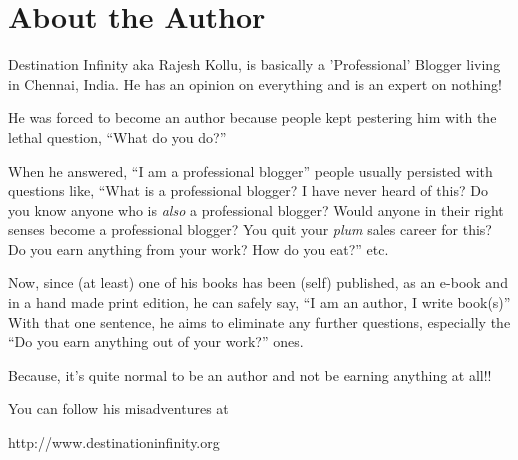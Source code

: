 \chapter{About the Author}

Destination Infinity aka Rajesh Kollu, is basically a 'Professional' Blogger
living in Chennai, India. He has an opinion on everything and is an expert on
nothing!

He was forced to become an author because people kept pestering him with the
lethal question, “What do you do?”

When he answered, “I am a professional blogger” people usually persisted with
questions like, “What is a professional blogger? I have never heard of this? Do
you know anyone who is \emph{also} a professional blogger? Would anyone in their
right senses become a professional blogger? You quit your \emph{plum} sales
career for this? Do you earn anything from your work? How do you eat?” etc.

Now, since (at least) one of his books has been (self) published, as an e-book
and in a hand made print edition, he can safely say, “I am an author, I write
book(s)” With that one sentence, he aims to eliminate any further questions,
especially the “Do you earn anything out of your work?” ones.

Because, it's quite normal to be an author and not be earning anything at all!!
\faGrinBeam[regular]

You can follow his misadventures at

\vspace{1ex}

\centerline{http://www.destinationinfinity.org}